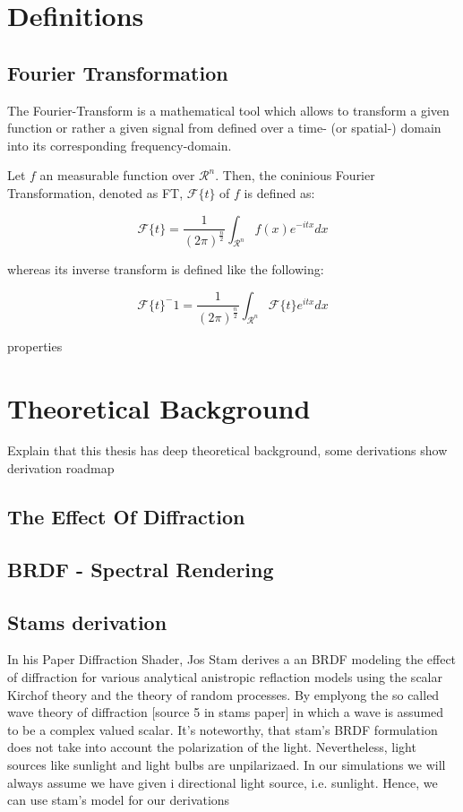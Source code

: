 \section{Definitions}
\subsection{Fourier Transformation}
The Fourier-Transform is a mathematical tool which allows to transform a given function or rather a given signal from defined over a time- (or spatial-) domain into its corresponding frequency-domain.
 
Let $f$ an measurable function over $\mathcal{R}^n$. Then, the coninious Fourier Transformation, denoted as FT, $\mathcal{F}\{t\}$ of $f$ is defined as:
 
\begin{equation}
  \mathcal{F}\{t\} = \frac{1}{(2\pi)^\frac{n}{2}}\int_{\mathcal{R}^n} f(x)e^{-itx}dx
\end{equation}

whereas its inverse transform is defined like the following:

\begin{equation}
  \mathcal{F}\{t\}^-1 = \frac{1}{(2\pi)^\frac{n}{2}}\int_{\mathcal{R}^n} \mathcal{F}\{t\}e^{itx}dx
\end{equation}

properties


\section{Theoretical Background}
Explain that this thesis has deep theoretical background, some derivations
show derivation roadmap
\subsection{The Effect Of Diffraction}

\subsection{BRDF - Spectral Rendering}

\subsection{Stams derivation}

In his Paper Diffraction Shader, Jos Stam derives a an BRDF modeling the effect of diffraction for various analytical anistropic reflaction models using the scalar Kirchof theory and the theory of random processes. By emplyong the so called wave theory of diffraction [source 5 in stams paper] in which a wave is assumed to be a complex valued scalar. It's noteworthy, that stam's BRDF formulation does not take into account the polarization of the light. Nevertheless, light sources like sunlight and light bulbs are unpilarizaed. In our simulations we will always assume we have given i directional light source, i.e. sunlight. Hence, we can use stam's model for our derivations


